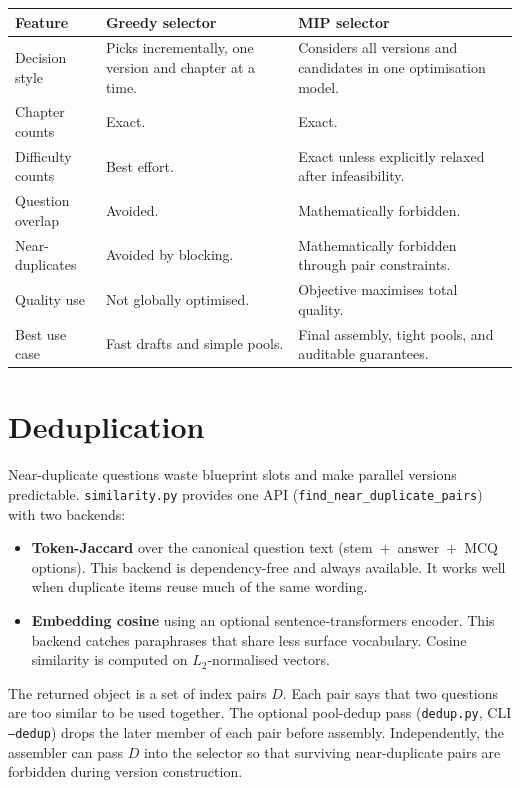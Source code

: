 \documentclass[11pt,a4paper]{article}
\newcommand{\code}[1]{\texttt{\small #1}}
\newcommand{\pkg}[1]{\texttt{\small #1}}
\begin{document}
\begin{center}
\begin{tabular}{@{}p{3.6cm}p{4.4cm}p{4.4cm}@{}}
\toprule
\textbf{Feature} & \textbf{Greedy selector} & \textbf{MIP selector} \\
\midrule
Decision style & Picks incrementally, one version and chapter at a time. & Considers all versions and candidates in one optimisation model. \\
Chapter counts & Exact. & Exact. \\
Difficulty counts & Best effort. & Exact unless explicitly relaxed after infeasibility. \\
Question overlap & Avoided. & Mathematically forbidden. \\
Near-duplicates & Avoided by blocking. & Mathematically forbidden through pair constraints. \\
Quality use & Not globally optimised. & Objective maximises total quality. \\
Best use case & Fast drafts and simple pools. & Final assembly, tight pools, and auditable guarantees. \\
\bottomrule
\end{tabular}
\end{center}

\section{Deduplication}
\label{sec:dedup}

Near-duplicate questions waste blueprint slots and make parallel versions
predictable. \pkg{similarity.py} provides one API
(\code{find\_near\_duplicate\_pairs}) with two backends:

\begin{itemize}[nosep,leftmargin=1.4em]
  \item \textbf{Token-Jaccard} over the canonical question text
  (stem~+~answer~+~MCQ options). This backend is dependency-free and always
  available. It works well when duplicate items reuse much of the same wording.
  \item \textbf{Embedding cosine} using an optional sentence-transformers
  encoder. This backend catches paraphrases that share less surface vocabulary.
  Cosine similarity is computed on $L_2$-normalised vectors.
\end{itemize}

The returned object is a set of index pairs $D$. Each pair says that two
questions are too similar to be used together. The optional pool-dedup pass
(\pkg{dedup.py}, CLI \code{--dedup}) drops the later member of each pair before
assembly. Independently, the assembler can pass $D$ into the selector so that
surviving near-duplicate pairs are forbidden during version construction.
\end{document}
